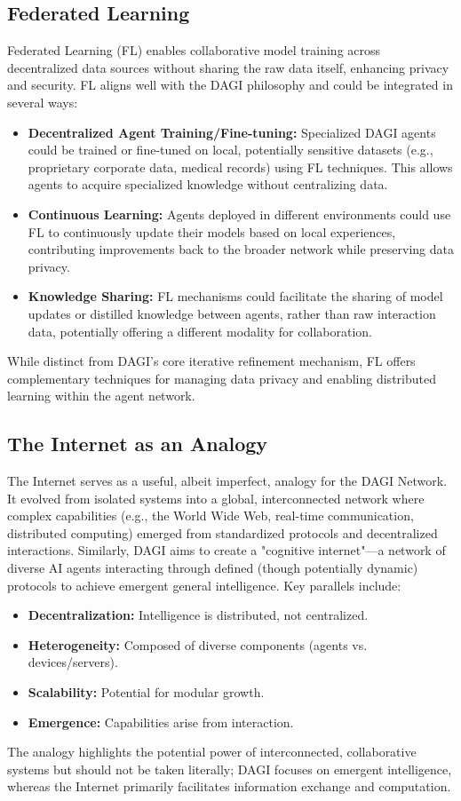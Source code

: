 \documentclass[12pt]{amsart}
\begin{document}
\subsection{Federated Learning}
Federated Learning (FL) enables collaborative model training across decentralized data sources without sharing the raw data itself, enhancing privacy and security. FL aligns well with the DAGI philosophy and could be integrated in several ways:
\begin{itemize}[leftmargin=*]
    \item \textbf{Decentralized Agent Training/Fine-tuning:} Specialized DAGI agents could be trained or fine-tuned on local, potentially sensitive datasets (e.g., proprietary corporate data, medical records) using FL techniques. This allows agents to acquire specialized knowledge without centralizing data.
    \item \textbf{Continuous Learning:} Agents deployed in different environments could use FL to continuously update their models based on local experiences, contributing improvements back to the broader network while preserving data privacy.
    \item \textbf{Knowledge Sharing:} FL mechanisms could facilitate the sharing of model updates or distilled knowledge between agents, rather than raw interaction data, potentially offering a different modality for collaboration.
\end{itemize}
While distinct from DAGI's core iterative refinement mechanism, FL offers complementary techniques for managing data privacy and enabling distributed learning within the agent network.

\subsection{The Internet as an Analogy}
The Internet serves as a useful, albeit imperfect, analogy for the DAGI Network. It evolved from isolated systems into a global, interconnected network where complex capabilities (e.g., the World Wide Web, real-time communication, distributed computing) emerged from standardized protocols and decentralized interactions. Similarly, DAGI aims to create a "cognitive internet"—a network of diverse AI agents interacting through defined (though potentially dynamic) protocols to achieve emergent general intelligence. Key parallels include:
\begin{itemize}[leftmargin=*]
    \item \textbf{Decentralization:} Intelligence is distributed, not centralized.
    \item \textbf{Heterogeneity:} Composed of diverse components (agents vs. devices/servers).
    \item \textbf{Scalability:} Potential for modular growth.
    \item \textbf{Emergence:} Capabilities arise from interaction.
\end{itemize}
The analogy highlights the potential power of interconnected, collaborative systems but should not be taken literally; DAGI focuses on emergent intelligence, whereas the Internet primarily facilitates information exchange and computation.
\end{document}
